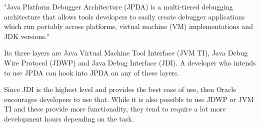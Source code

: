 \documentclass[..thesis.tex]{subfiles}
\begin{document}

"Java Platform Debugger Architecture (JPDA) is a multi-tiered debugging architecture that allows tools developers to easily create debugger applications which run portably across platforms, virtual machine (VM) implementations and JDK versions."\cite{oracle_jpda_spec} 

Its three layers are Java Virtual Machine Tool Interface (JVM TI), Java Debug Wire Protocol (JDWP) and Java Debug Interface (JDI). 
A developer who intends to use JPDA can hook into JPDA on any of these layers. \cite{oracle_jpda_spec} 

Since JDI is the highest level and provides the best ease of use, then Oracle encourages developers to use that.\cite{oracle_jpda_spec}
While it is also possible to use JDWP or JVM TI and these provide more functionality, they tend to require a lot more development hours depending on the task. 
\end{document}
